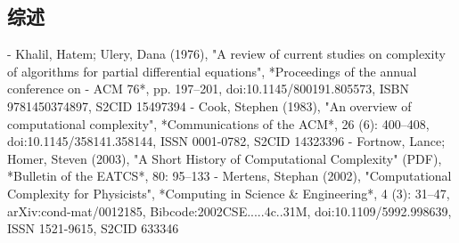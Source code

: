 \subsection{综述}
- Khalil, Hatem; Ulery, Dana (1976), "A review of current studies on complexity of algorithms for partial differential equations", *Proceedings of the annual conference on - ACM 76*, pp. 197–201, doi:10.1145/800191.805573, ISBN 9781450374897, S2CID 15497394
- Cook, Stephen (1983), "An overview of computational complexity", *Communications of the ACM*, 26 (6): 400–408, doi:10.1145/358141.358144, ISSN 0001-0782, S2CID 14323396
- Fortnow, Lance; Homer, Steven (2003), "A Short History of Computational Complexity" (PDF), *Bulletin of the EATCS*, 80: 95–133
- Mertens, Stephan (2002), "Computational Complexity for Physicists", *Computing in Science & Engineering*, 4 (3): 31–47, arXiv:cond-mat/0012185, Bibcode:2002CSE.....4c..31M, doi:10.1109/5992.998639, ISSN 1521-9615, S2CID 633346
  




 